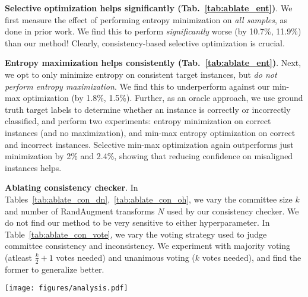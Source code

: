 \documentclass[10pt,twocolumn,letterpaper]{article}
\newcommand{\method}{\texttt{SENTRY}\xspace}
\begin{document}
\noindent \textbf{Selective optimization helps significantly (Tab.~\ref{tab:ablate_ent})}. We first measure the effect of performing entropy minimization on \emph{all samples}, as done in prior work. We find this to perform \emph{significantly} worse (by 10.7\%, 11.9\%) than our method! Clearly, consistency-based selective optimization is crucial. 

\noindent \textbf{Entropy maximization helps consistently (Tab.~\ref{tab:ablate_ent})}. Next, we opt to only minimize entropy on consistent target instances, but \emph{do not perform entropy maximization}. We find this to underperform against our min-max optimization (by 1.8\%, 1.5\%).
Further, as an oracle approach, we use ground truth target labels to determine whether an instance is correctly or incorrectly classified, and perform two experiments: entropy minimization on correct instances (and no maximization), and min-max entropy optimization on correct and incorrect instances. Selective min-max optimization again outperforms just minimization by 2\% and 2.4\%, showing that reducing confidence on misaligned instances helps.


\noindent \textbf{Ablating consistency checker}. In Tables~\ref{tab:ablate_con_dn},~\ref{tab:ablate_con_oh}, we vary the committee size $k$ and number of RandAugment transforms $N$ used by our consistency checker. We do not find our method to be very sensitive to either hyperparameter. In Table~\ref{tab:ablate_con_vote}, we vary the voting strategy used to judge committee consistency and inconsistency. We experiment with majority voting (atleast $\frac{k}{2}+1$ votes needed) and unanimous voting ($k$ votes needed), and find the former to generalize better.


\begin{figure*}[t]
    \centering
    \texttt{[image: figures/analysis.pdf]}
    \vspace{-8pt}
    \caption{
    Analysis of \method on Clipart$\rightarrow$Sketch. \textbf{Left:} \% of seen target instances selected for entropy minimization and maximization over epochs. \textbf{Middle:} \% of seen target data chosen for entropy minimization at the end of first and last epochs of adaptation, broken down by class. \textbf{Right:} Ground truth precision of \method's committee consistency strategy at identifying correct and incorrect instances over epochs.
    }
    \vspace{-15pt}
    \label{fig:consistency_perf}
 \end{figure*}
\end{document}
